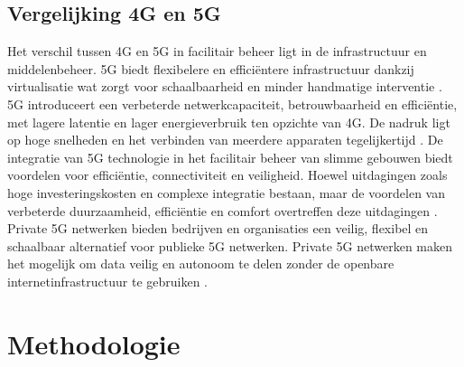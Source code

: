 \subsection{Vergelijking 4G en 5G}
Het verschil tussen 4G en 5G in facilitair beheer ligt in de infrastructuur en middelenbeheer. 5G biedt flexibelere en efficiëntere infrastructuur dankzij virtualisatie wat zorgt voor schaalbaarheid en minder handmatige interventie \autocite{degambur2021resource}. 5G introduceert een verbeterde netwerkcapaciteit, betrouwbaarheid en efficiëntie, met lagere latentie en lager energieverbruik ten opzichte van 4G. De nadruk ligt op hoge snelheden en het verbinden van meerdere apparaten tegelijkertijd \autocite{mihret20214g}. De integratie van 5G technologie in het facilitair beheer van slimme gebouwen biedt voordelen voor efficiëntie, connectiviteit en veiligheid. Hoewel uitdagingen zoals hoge investeringskosten en complexe integratie bestaan, maar de voordelen van verbeterde duurzaamheid, efficiëntie en comfort overtreffen deze uitdagingen \autocite{Markogiannaki2023}. Private 5G netwerken bieden bedrijven en organisaties een veilig, flexibel en schaalbaar alternatief voor publieke 5G netwerken. Private 5G netwerken maken het mogelijk om data veilig en autonoom te delen zonder de openbare internetinfrastructuur te gebruiken \autocite{eswaran2023private}.






\section{Methodologie}
\label{sec:methodologie}

